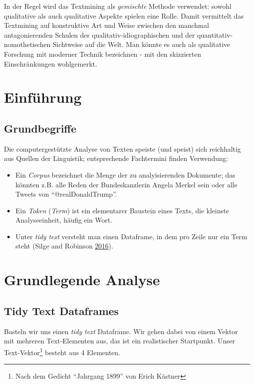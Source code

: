 \documentclass[12pt,]{book}
\let\rmarkdownfootnote\footnote%
\def\footnote{\protect\rmarkdownfootnote}
\begin{document}
In der Regel wird das Textmining als \emph{gemischte} Methode verwendet:
sowohl qualitative als auch qualitative Aspekte spielen eine Rolle.
Damit vermittelt das Textmining auf konstruktive Art und Weise zwischen
den manchmal antagonierenden Schulen der qualitativ-idiographischen und
der quantitativ-nomothetischen Sichtweise auf die Welt. Man könnte es
auch als qualitative Forschung mit moderner Technik bezeichnen - mit den
skizzierten Einschränkungen wohlgemerkt.

\section{Einführung}\label{einfuhrung-2}

\subsection{Grundbegriffe}\label{grundbegriffe}

Die computergestützte Analyse von Texten speiste (und speist) sich
reichhaltig aus Quellen der Linguistik; entsprechende Fachtermini finden
Verwendung:

\begin{itemize}
\item
  Ein \emph{Corpus} bezeichnet die Menge der zu analyisierenden
  Dokumente; das könnten z.B. alle Reden der Bundeskanzlerin Angela
  Merkel sein oder alle Tweets von ``@realDonaldTrump''.
\item
  Ein \emph{Token} (\emph{Term}) ist ein elementarer Baustein eines
  Texts, die kleinste Analyseeinheit, häufig ein Wort.
\item
  Unter \emph{tidy text} versteht man einen Dataframe, in dem pro Zeile
  nur ein Term steht (Silge and Robinson
  \protect\hyperlink{ref-Silge2016}{2016}).
\end{itemize}

\section{Grundlegende Analyse}\label{grundlegende-analyse}

\subsection{Tidy Text Dataframes}\label{tidy-text-dataframes}

Basteln wir uns einen \emph{tidy text} Dataframe. Wir gehen dabei von
einem Vektor mit mehreren Text-Elementen aus, das ist ein realistischer
Startpunkt. Unser Text-Vektor\footnote{Nach dem Gedicht ``Jahrgang
  1899'' von Erich Kästner} besteht aus 4 Elementen.
\end{document}
